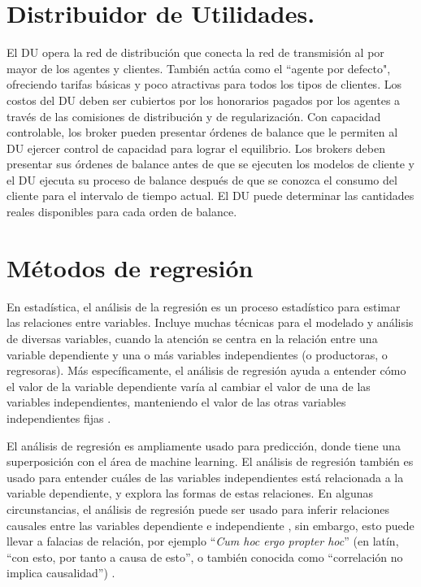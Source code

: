 \section{Distribuidor de Utilidades.}
El DU opera la red de distribución que conecta la red de transmisión al por mayor de los agentes y clientes. También actúa como el “agente por defecto", ofreciendo tarifas básicas y poco atractivas para todos los tipos de clientes. 
Los  costos del DU deben ser cubiertos por los honorarios pagados por los agentes a través de las comisiones de distribución y de regularización. 
Con capacidad controlable, los broker pueden presentar órdenes de balance que le permiten al DU ejercer control de capacidad para lograr el equilibrio. 
Los brokers deben presentar sus órdenes de balance antes de que se ejecuten los modelos de cliente y el DU ejecuta su proceso de balance después de que se conozca el consumo del cliente para el intervalo de tiempo actual. 
El DU puede determinar las cantidades reales disponibles para cada orden de balance.
\\
\section{Métodos de regresión}
En estadística, el análisis de la regresión es un proceso estadístico para estimar las relaciones entre variables. Incluye muchas técnicas para el modelado y análisis de diversas variables, cuando la atención se centra en la relación entre una variable
dependiente y una o más variables independientes (o productoras, o regresoras).
Más específicamente, el análisis de regresión ayuda a entender cómo el valor de la variable dependiente varía al cambiar el valor de una de las variables independientes, manteniendo el valor de las otras variables independientes fijas \cite{BoundlessRegressionAnalysis}.

El análisis de regresión es ampliamente usado para predicción, donde tiene una superposición con el área de machine learning. 
El análisis de regresión también es usado para entender cuáles de las variables independientes está relacionada a la variable dependiente, y explora las formas de estas relaciones. 
En algunas circunstancias, el análisis de regresión puede ser usado para inferir relaciones causales entre las variables dependiente e independiente \cite{BoundlessRegressionAnalysis}, sin embargo, esto puede llevar a falacias de relación, por ejemplo ``\textit{Cum hoc ergo propter hoc}'' (en latín, ``con esto, por tanto a causa de esto'', o también conocida como ``correlación no implica causalidad'') \cite{JSArmstrongIllusions}.

